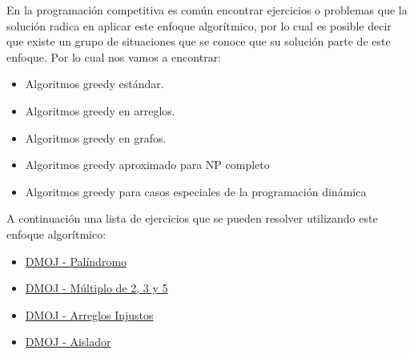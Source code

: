 En la programación competitiva es común encontrar ejercicios o problemas que la solución radica en aplicar este enfoque algorítmico, por lo cual es posible decir que existe un grupo de situaciones que se conoce que su solución parte de este enfoque. Por lo cual nos vamos a encontrar:

\begin{itemize}
	\item Algoritmos greedy estándar.
	\item Algoritmos greedy en arreglos.
	\item Algoritmos greedy en grafos.
	\item Algoritmos greedy aproximado para NP completo
	\item Algoritmos greedy para casos especiales de la programación dinámica 
\end{itemize} 

A continuación una lista de ejercicios que se pueden resolver utilizando este enfoque algorítmico:

\begin{itemize}
	\item \href{https://dmoj.uclv.edu.cu/problem/pallargo}{DMOJ - Palíndromo}
	\item \href{https://dmoj.uclv.edu.cu/problem/m235}{DMOJ - Múltiplo de 2, 3 y 5}
	\item \href{https://dmoj.uclv.edu.cu/problem/maxmin}{DMOJ - Arreglos Injustos}
	\item \href{https://dmoj.uclv.edu.cu/problem/aisalador}{DMOJ - Aislador}
\end{itemize}